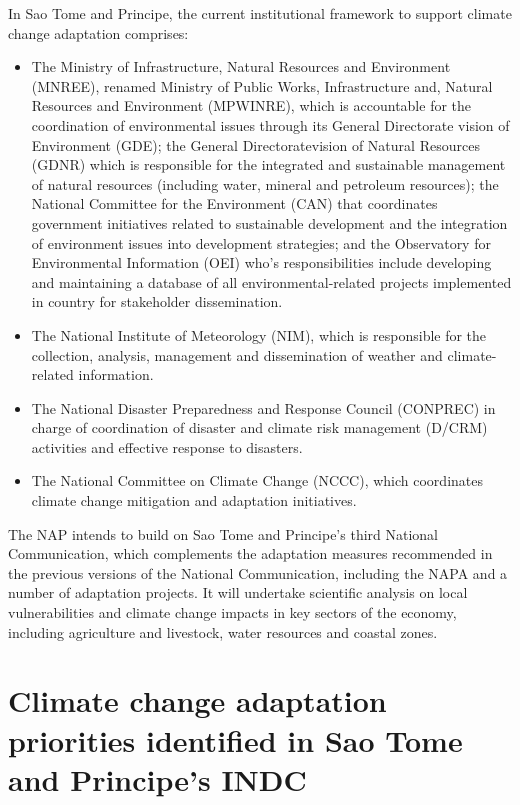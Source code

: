 \documentclass[
]{book}
\providecommand{\tightlist}{%
  \setlength{\itemsep}{0pt}\setlength{\parskip}{0pt}}
\begin{document}
In Sao Tome and Principe, the current institutional framework to support climate change adaptation comprises:

\begin{itemize}
\tightlist
\item
  The Ministry of Infrastructure, Natural Resources and Environment (MNREE), renamed Ministry of Public Works, Infrastructure and, Natural Resources and Environment (MPWINRE), which is accountable for the coordination of environmental issues through its General Directorate vision of Environment (GDE); the General Directoratevision of Natural Resources (GDNR) which is responsible for the integrated and sustainable management of natural resources (including water, mineral and petroleum resources); the National Committee for the Environment (CAN) that coordinates government initiatives related to sustainable development and the integration of environment issues into development strategies; and the Observatory for Environmental Information (OEI) who's responsibilities include developing and maintaining a database of all environmental-related projects implemented in country for stakeholder dissemination.\\
\item
  The National Institute of Meteorology (NIM), which is responsible for the collection, analysis, management and dissemination of weather and climate-related information.
\item
  The National Disaster Preparedness and Response Council (CONPREC) in charge of coordination of disaster and climate risk management (D/CRM) activities and effective response to disasters.
\item
  The National Committee on Climate Change (NCCC), which coordinates climate change mitigation and adaptation initiatives.
\end{itemize}

The NAP intends to build on Sao Tome and Principe's third National Communication, which complements the adaptation measures recommended in the previous versions of the National Communication, including the NAPA and a number of adaptation projects. It will undertake scientific analysis on local vulnerabilities and climate change impacts in key sectors of the economy, including agriculture and livestock, water resources and coastal zones.

\hypertarget{climate-change-adaptation-priorities-identified-in-sao-tome-and-principes-indc-1}{%
\section{Climate change adaptation priorities identified in Sao Tome and Principe's INDC}\label{climate-change-adaptation-priorities-identified-in-sao-tome-and-principes-indc-1}}
\end{document}
